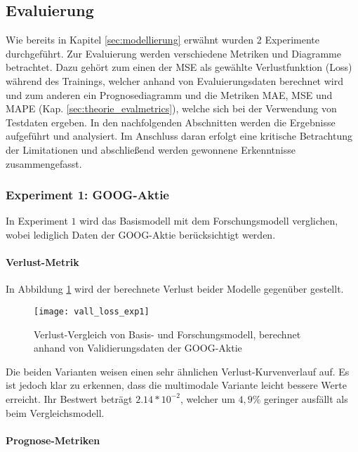 \newpage
\subsection{Evaluierung}\label{sec:evaluierung}

Wie bereits in Kapitel \ref{sec:modellierung} erwähnt wurden 2 Experimente durchgeführt. Zur Evaluierung werden verschiedene Metriken und Diagramme betrachtet. Dazu gehört zum einen der \ac{MSE} als gewählte Verlustfunktion (Loss) während des Trainings, welcher anhand von Evaluierungsdaten berechnet wird und zum anderen ein Prognosediagramm und die Metriken \ac{MAE}, \ac{MSE} und \ac{MAPE} (Kap. \ref{sec:theorie_evalmetrics}), welche sich bei der Verwendung von Testdaten ergeben.
In den nachfolgenden Abschnitten werden die Ergebnisse aufgeführt und analysiert. Im Anschluss daran erfolgt eine kritische Betrachtung der Limitationen und abschließend werden gewonnene Erkenntnisse zusammengefasst. 

\subsubsection{Experiment 1: GOOG-Aktie}\label{sec:evaluierung_exp1}
In Experiment $1$ wird das Basismodell mit dem Forschungsmodell verglichen, wobei lediglich Daten der GOOG-Aktie berücksichtigt werden. 

\paragraph*{Verlust-Metrik} 

In Abbildung \ref{fig:vall_loss_exp1} wird der berechnete Verlust beider Modelle gegenüber gestellt.
\begin{figure}[H]
	\texttt{[image: vall\_loss\_exp1]}
	\caption{Verlust-Vergleich von Basis- und Forschungsmodell, berechnet anhand von Validierungsdaten der GOOG-Aktie}
	\label{fig:vall_loss_exp1}
\end{figure}
Die beiden Varianten weisen einen sehr ähnlichen Verlust-Kurvenverlauf auf. Es ist jedoch klar zu erkennen, dass die multimodale Variante leicht bessere Werte erreicht. Ihr Bestwert beträgt $2.14*10^{-2}$, welcher um $4,9\%$ geringer ausfällt als beim Vergleichsmodell.

\paragraph*{Prognose-Metriken} 

